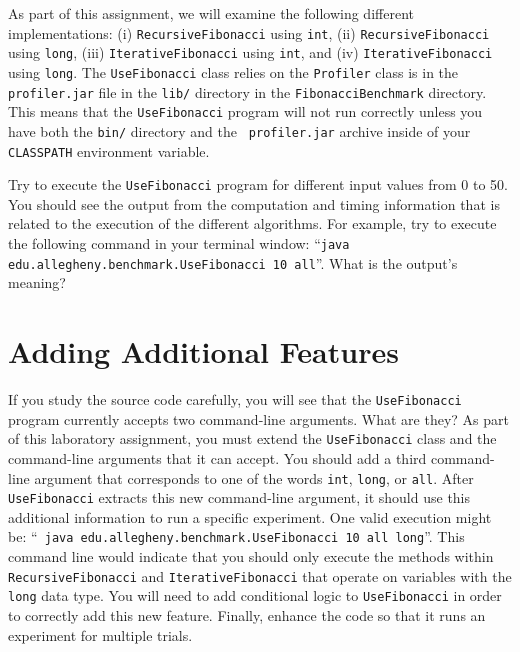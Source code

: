\begin{sloppypar}

  As part of this assignment, we will examine the following different implementations: (i) {\tt RecursiveFibonacci}
  using {\tt int}, (ii) {\tt RecursiveFibonacci} using {\tt long}, (iii) {\tt IterativeFibonacci} using {\tt int}, and
  (iv) {\tt IterativeFibonacci} using {\tt long}. The {\tt UseFibonacci} class relies on the {\tt Profiler} class is in
  the {\tt profiler.jar} file in the {\tt lib/} directory in the {\tt FibonacciBenchmark} directory.  This means that
  the {\tt UseFibonacci} program will not run correctly unless you have both the {\tt bin/} directory and the {\tt
  profiler.jar} archive inside of your {\tt CLASSPATH} environment variable.

\end{sloppypar}

Try to execute the {\tt UseFibonacci} program for different input values from 0 to 50. You should see the output
from the computation and timing information that is related to the execution of the different algorithms. For example,
try to execute the following command in your terminal window: ``{\tt java edu.allegheny.benchmark.UseFibonacci 10
all}''. What is the output's meaning?

\section*{Adding Additional Features}

If you study the source code carefully, you will see that the {\tt UseFibonacci} program currently accepts two
command-line arguments. What are they? As part of this laboratory assignment, you must extend the {\tt UseFibonacci}
class and the command-line arguments that it can accept. You should add a third command-line argument that corresponds
to one of the words {\tt int}, {\tt long}, or {\tt all}. After {\tt UseFibonacci} extracts this new command-line
argument, it should use this additional information to run a specific experiment. One valid execution might be: ``{\tt
java edu.allegheny.benchmark.Use\-Fibonacci 10 all long}''. This command line would indicate that you should only
execute the methods within {\tt RecursiveFibonacci} and {\tt IterativeFibonacci} that operate on variables with the
{\tt long} data type. You will need to add conditional logic to {\tt UseFibonacci} in order to correctly add this new
feature. Finally, enhance the code so that it runs an experiment for multiple trials.

